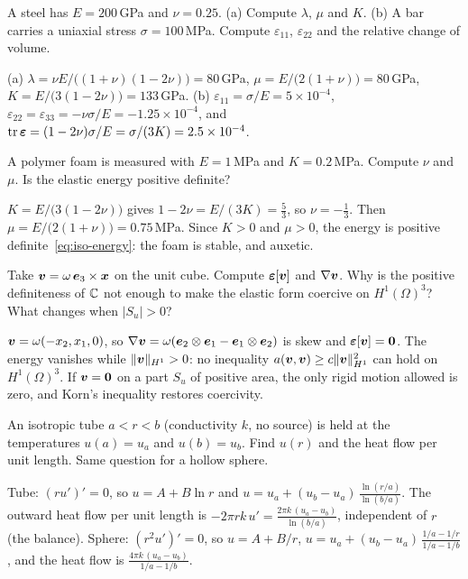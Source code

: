 \label{exo:q-constants}
A steel has $E=200$\,GPa and $\nu=0.25$. (a) Compute $\lambda$, $\mu$ and $K$.
(b) A bar carries a uniaxial stress $\sigma=100$\,MPa. Compute
$\varepsilon_{11}$, $\varepsilon_{22}$ and the relative change of volume.
\begin{solution}
(a) $\lambda=\nu E/\bigl((1+\nu)(1-2\nu)\bigr)=80$\,GPa,
$\mu=E/\bigl(2(1+\nu)\bigr)=80$\,GPa, $K=E/\bigl(3(1-2\nu)\bigr)=133$\,GPa.
(b) $\varepsilon_{11}=\sigma/E=5\times10^{-4}$,
$\varepsilon_{22}=\varepsilon_{33}=-\nu\sigma/E=-1.25\times10^{-4}$, and
$\operatorname{tr}\bm{\varepsilon}=(1-2\nu)\sigma/E=\sigma/(3K)=2.5\times10^{-4}$.
\end{solution}

\label{exo:q-stable}
%
A polymer foam is measured with $E=1$\,MPa and $K=0.2$\,MPa. Compute $\nu$
and $\mu$. Is the elastic energy positive definite?
\begin{solution}
$K=E/\bigl(3(1-2\nu)\bigr)$ gives $1-2\nu=E/(3K)=\tfrac53$, so $\nu=-\tfrac13$.
Then $\mu=E/\bigl(2(1+\nu)\bigr)=0.75$\,MPa. Since $K>0$ and $\mu>0$, the energy
is positive definite~\eqref{eq:iso-energy}: the foam is stable, and auxetic.
\end{solution}

\label{exo:q-korn}
%
Take $\bm{v}=\omega\,\bm{e}_3\times\bm{x}$ on the unit cube. Compute $\bm{\varepsilon}[\bm{v}]$ and
$\nabla\bm{v}$. Why is the positive definiteness of $\mathbb{C}$ not enough to make the
elastic form coercive on $H^1(\Omega)^3$? What changes when $|S_u|>0$?
\begin{solution}
$\bm{v}=\omega(-x_2,x_1,0)$, so $\nabla\bm{v}=\omega(\bm{e}_2\otimes\bm{e}_1-\bm{e}_1\otimes\bm{e}_2)$
is skew and $\bm{\varepsilon}[\bm{v}]=\bm{0}$. The energy vanishes while
$\lVert \bm{v}\rVert_{H^1}>0$: no inequality $a(\bm{v},\bm{v})\ge c\lVert \bm{v}\rVert^2_{H^1}$ can hold
on $H^1(\Omega)^3$. If $\bm{v}=\bm{0}$ on a part $S_u$ of positive area, the only
rigid motion allowed is zero, and Korn's inequality restores coercivity.
\end{solution}

\label{exo:q-radial}
%
An isotropic tube $a<r<b$ (conductivity $k$, no source) is held at the
temperatures $u(a)=u_a$ and $u(b)=u_b$. Find $u(r)$ and the heat flow per unit
length. Same question for a hollow sphere.
\begin{solution}
Tube: $(ru')'=0$, so $u=A+B\ln r$ and
$\displaystyle u=u_a+(u_b-u_a)\,\frac{\ln(r/a)}{\ln(b/a)}$. The outward heat flow
per unit length is $\displaystyle -2\pi rk\,u'=\frac{2\pi k\,(u_a-u_b)}{\ln(b/a)}$,
independent of $r$ (the balance). Sphere: $(r^2u')'=0$, so $u=A+B/r$,
$\displaystyle u=u_a+(u_b-u_a)\,\frac{1/a-1/r}{1/a-1/b}$, and the heat flow is
$\displaystyle \frac{4\pi k\,(u_a-u_b)}{1/a-1/b}$.
\end{solution}

